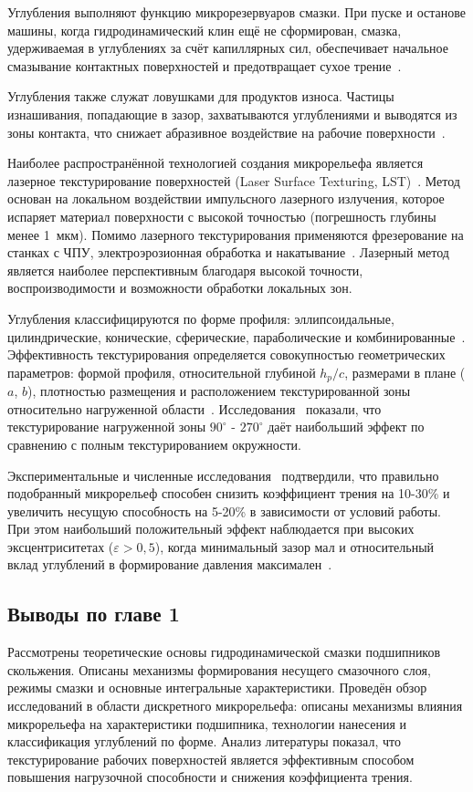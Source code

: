 Углубления выполняют функцию микрорезервуаров смазки. При пуске и останове машины, когда гидродинамический клин ещё не сформирован, смазка, удерживаемая в углублениях за счёт капиллярных сил, обеспечивает начальное смазывание контактных поверхностей и предотвращает сухое трение~\cite{galda2009}.

Углубления также служат ловушками для продуктов износа. Частицы изнашивания, попадающие в зазор, захватываются углублениями и выводятся из зоны контакта, что снижает абразивное воздействие на рабочие поверхности~\cite{etsion2005}.

Наиболее распространённой технологией создания микрорельефа является лазерное текстурирование поверхностей (Laser Surface Texturing, LST)~\cite{etsion2005}. Метод основан на локальном воздействии импульсного лазерного излучения, которое испаряет материал поверхности с высокой точностью (погрешность глубины менее 1~мкм). Помимо лазерного текстурирования применяются фрезерование на станках с ЧПУ, электроэрозионная обработка и накатывание~\cite{gropper2016}. Лазерный метод является наиболее перспективным благодаря высокой точности, воспроизводимости и возможности обработки локальных зон.

Углубления классифицируются по форме профиля: эллипсоидальные, цилиндрические, конические, сферические, параболические и комбинированные~\cite{gropper2016}. Эффективность текстурирования определяется совокупностью геометрических параметров: формой профиля, относительной глубиной $h_p/c$, размерами в плане ($a$, $b$), плотностью размещения и расположением текстурированной зоны относительно нагруженной области~\cite{tala2012, brizmer2003, rahmani2007}. Исследования~\cite{tala2012} показали, что текстурирование нагруженной зоны $90^\circ\text{ - }270^\circ$ даёт наибольший эффект по сравнению с полным текстурированием окружности.

Экспериментальные и численные исследования~\cite{kligerman2005, zhang2016, wang2013} подтвердили, что правильно подобранный микрорельеф способен снизить коэффициент трения на 10-30\% и увеличить несущую способность на 5-20\% в зависимости от условий работы. При этом наибольший положительный эффект наблюдается при высоких эксцентриситетах ($\varepsilon > 0{,}5$), когда минимальный зазор мал и относительный вклад углублений в формирование давления максимален~\cite{dobrica2010}.

\subsection*{Выводы по главе 1}
{}

Рассмотрены теоретические основы гидродинамической смазки подшипников скольжения. Описаны механизмы формирования несущего смазочного слоя, режимы смазки и основные интегральные характеристики. Проведён обзор исследований в области дискретного микрорельефа: описаны механизмы влияния микрорельефа на характеристики подшипника, технологии нанесения и классификация углублений по форме. Анализ литературы показал, что текстурирование рабочих поверхностей является эффективным способом повышения нагрузочной способности и снижения коэффициента трения.

